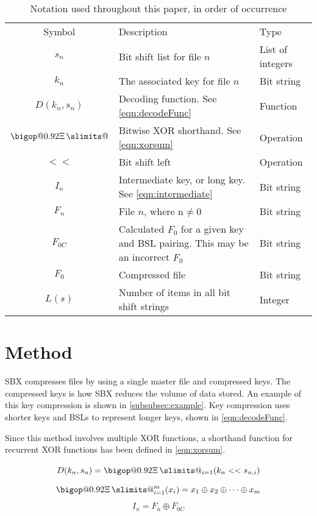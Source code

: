 \documentclass[10pt]{article}
\makeatletter
\DeclareRobustCommand\bigop[2][1]{%
  \mathop{\vphantom{\sum}\mathpalette\bigop@{{#1}{#2}}}\slimits@
}
\newcommand{\bigop@}[2]{\bigop@@#1#2}
\newcommand{\bigop@@}[3]{%
  \vcenter{%
    \sbox\z@{$#1\sum$}%
    \hbox{\resizebox{\ifx#1\displaystyle#2\fi\dimexpr\ht\z@+\dp\z@}{!}{$\m@th#3$}}%
  }%
}
\newcommand{\XORsum}{\DOTSB\bigop[0.92]{\Xi}}
\makeatother
\begin{document}
\begin{table}[ht]
    \centering
    \begin{tabular}{c >{\raggedleft\arraybackslash}p{5.5cm} >{\raggedleft\arraybackslash}p{3cm}}
        \hline
        Symbol & Description & Type \\
        \Xhline{3\arrayrulewidth}
        $s_n$ & Bit shift list for file $n$ & List of integers \\
        $k_n$ & The associated key for file $n$ & Bit string \\
        $D(k_n,s_n)$ & Decoding function. See \cref{eqn:decodeFunc} & Function \\
        $\XORsum$ & Bitwise XOR shorthand. See \cref{eqn:xorsum} & Operation \\
        $<<$ & Bit shift left & Operation \\
        $I_n$ & Intermediate key, or long key. See \cref{eqn:intermediate} & Bit string \\
        $F_n$ & File $n$, where n$\neq0$ & Bit string \\
        $F_{0C}$ & Calculated $F_0$ for a given key and BSL pairing. This may be an incorrect $F_0$ & Bit
        string \\
        $F_0$ & Compressed file & Bit string \\
        $L(s)$ & Number of items in all bit shift strings & Integer\\
        \hline
    \end{tabular}
    \caption{Notation used throughout this paper, in order of occurrence}
    \label{tab:notationTable}
\end{table}


\section{Method}

SBX compresses files by using a single master file and compressed keys. The compressed keys is how SBX reduces the volume of data stored. An example of this key compression is shown in \cref{subsubsec:example}. Key compression uses shorter keys and BSLs to represent longer keys, shown in \cref{eqn:decodeFunc}.

Since this method involves multiple XOR functions, a shorthand function for recurrent XOR functions has been defined in \cref{eqn:xorsum}.

\begin{equation}\label{eqn:decodeFunc}
    D(k_n,s_n)=\XORsum_{i=1}(k_n << s_{n,i})
\end{equation}
\begin{equation}\label{eqn:xorsum}
    \XORsum_{i=1}^m(x_i)=x_1\oplus x_2\oplus \dots \oplus x_m
\end{equation}
\begin{equation}\label{eqn:intermediate}
    I_n=F_n\oplus F_{0C}
\end{equation}
\end{document}
